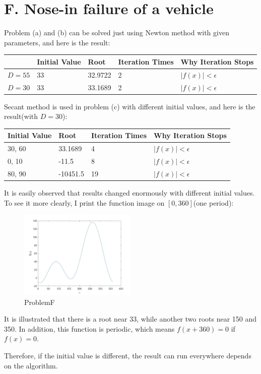 \documentclass[a4paper]{article}
\begin{document}
\section*{F. Nose-in failure of a vehicle}

Problem (a) and (b) can be solved just using Newton method with given parameters, and here is the result:

\begin{table}[!ht]
    \centering
    \begin{tabular}{|l|l|l|l|l|}
    \hline
        ~ & Initial Value& Root & Iteration Times & Why Iteration Stops\\ \hline
        $D = 55$ & 33 & 32.9722 & 2 & $|f(x)| < \epsilon$ \\ \hline
        $D = 30$ & 33 & 33.1689 & 2 & $|f(x)| < \epsilon$ \\ \hline
    \end{tabular}
\end{table}

Secant method is used in problem (c) with different initial values, and here is the result(with $D = 30$):

\begin{table}[!ht]
    \centering
    \begin{tabular}{|l|l|l|l|}
    \hline
        Initial Value& Root & Iteration Times & Why Iteration Stops\\ \hline
        30, 60& 33.1689 & 4 & $|f(x)| < \epsilon$ \\ \hline
        0, 10& -11.5 & 8 & $|f(x)| < \epsilon$ \\ \hline
        80, 90& -10451.5 & 19 & $|f(x)| < \epsilon$ \\ \hline
    \end{tabular}
\end{table}

It is easily observed that results changed enormously with different initial values. To see it more clearly, I print the function image on $[0,360]$(one period):
\begin{figure}[h]
    \centering
    \includegraphics[width=0.5\textwidth]{fig/ProblemF.jpg}
    \caption{ProblemF}
    \label{fig:ProblemF}
\end{figure}

It is illustrated that there is a root near 33, while another two roots near 150 and 350. In addition, this function is periodic, which means $f(x+360) = 0$ if $f(x) = 0$.

Therefore, if the initial value is different, the result can run everywhere depends on the algorithm.
\end{document}
